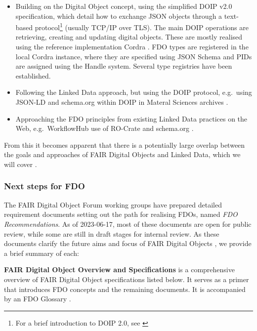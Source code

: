 \begin{itemize}
\tightlist
\item
  Building on the Digital Object concept, using the simplified DOIP v2.0 \cite{DONA 2018} specification, which detail how to exchange JSON objects through a text-based protocol\footnote{For a brief introduction to DOIP 2.0, see \cite{DOIPExamplesCordraa}} (usually TCP/IP over TLS). The main DOIP operations are retrieving, creating and updating digital objects. These are mostly realised using the reference implementation Cordra \cite{tupelo-schneckrobertBriefIntroductionCordra2022}. FDO types are registered in the local Cordra instance, where they are specified using JSON Schema \cite{Draftbhuttonjsonschema} and PIDs are assigned using the Handle system. Several type registries have been established.
\item
  Following the Linked Data approach, but using the DOIP protocol, e.g.~using JSON-LD and schema.org within DOIP in Materal Sciences archives \cite{10.1002/jcc.26842}.
\item
  Approaching the FDO principles from existing Linked Data practices on the Web, e.g.~WorkflowHub use of RO-Crate and schema.org \cite{10.3897/rio.8.e93937}.
\end{itemize}

From this it becomes apparent that there is a potentially large overlap between the goals and approaches of FAIR Digital Objects and Linked Data, which we will cover .


\subsubsection{Next steps for FDO}\label{ch3:next-step-fdo}

The FAIR Digital Object Forum \cite{FAIRDigitalObjects} working groups have prepared detailed requirement documents \cite{fdo-Specs} setting out the path for realising FDOs, named \emph{FDO Recommendations}. As of 2023-06-17, most of these documents are open for public review, while some are still in draft stages for internal review. As these documents clarify the future aims and focus of FAIR Digital Objects \cite{fdo-Roadmap}, we provide a brief summary of each:

\textbf{FAIR Digital Object Overview and Specifications} \cite{fdo-Overview} is a comprehensive overview of FAIR Digital Object specifications listed below. It serves as a primer that introduces FDO concepts and the remaining documents. It is accompanied by an FDO Glossary \cite{fdo-Glossary}.

